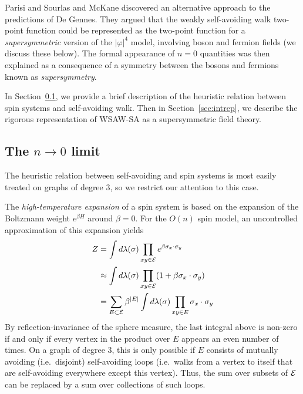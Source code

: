 Parisi and Sourlas \cite{PS80} and McKane \cite{McKa80} discovered
an alternative approach to the predictions of De Gennes. They argued that the weakly
self-avoiding walk two-point function could be represented as the two-point function
for a \emph{supersymmetric} version of the $|\varphi|^4$ model, involving boson and
fermion fields (we discuss these below). The formal appearance of $n = 0$ quantities
was then explained as a consequence of a symmetry between the bosons and fermions known
as \emph{supersymmetry}.

In Section~\ref{sec:ntozero}, we provide a brief description of the heuristic
relation between spin systems and self-avoiding walk. Then in Section~\ref{sec:intrep},
we describe the rigorous representation of WSAW-SA as a supersymmetric field
theory.


\subsection{The \texorpdfstring{$n\to0$}{n approaches 0} limit}
\label{sec:ntozero}

The heuristic relation between self-avoiding and spin systems is most easily treated
on graphs of degree $3$, so we restrict our attention to this case.

The \emph{high-temperature expansion} of a spin system is based on the expansion of the
Boltzmann weight $e^{\beta H}$ around $\beta = 0$.
For the $O(n)$ spin model, an uncontrolled approximation of this expansion yields
\begin{align}
Z 	&= \int d\lambda(\sigma) \prod_{xy\in\mathcal{E}} e^{\beta \sigma_x \cdot \sigma_y} \\
	&\approx \int d\lambda(\sigma) \prod_{xy\in\mathcal{E}} (1 + \beta \sigma_x \cdot \sigma_y) \\
	&= \sum_{E \subset \mathcal{E}} \beta^{|E|} \int d\lambda(\sigma) \prod_{xy \in E} \sigma_x \cdot \sigma_y
\end{align}
By reflection-invariance of the sphere measure, the last integral above is non-zero
if and only if every vertex in the product over $E$ appears an even number of times.
On a graph of degree $3$, this is only possible if $E$ consists of mutually avoiding
(i.e.\ disjoint) self-avoiding
loops (i.e.\ walks from a vertex to itself that are self-avoiding everywhere except this
vertex). Thus, the sum over subsets of $\mathcal{E}$ can be replaced by a sum over collections of
such loops.

